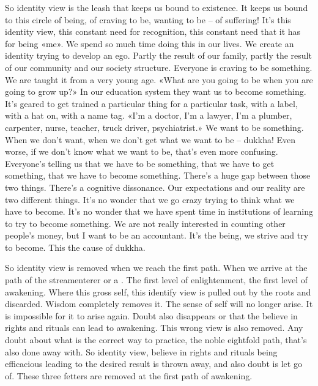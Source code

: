 \documentclass[letterpaper,10pt,english]{sphinxmanual}
\begin{document}
\sphinxAtStartPar
So identity view is the leash that keeps us bound to existence. It keeps
us bound to this circle of being, of craving to be, wanting to be – of suffering! It’s this identity view, this constant need for recognition, this constant
need that it has for being «me». We spend so much time doing this in our
  lives. We create an identity trying to develop an ego. Partly the result of our
family, partly the result of our community and our society structure. Everyone  is  craving  to  be  something.  We  are  taught  it  from  a  very  young  age.
«What are you going to be when you are going to grow up?» In our education system they want us to become something. It’s geared to get trained a
particular thing for a particular task, with a label, with a hat on, with a name
tag. «I’m a doctor, I’m a lawyer, I’m a plumber, carpenter, nurse, teacher,
truck driver, psychiatrist.» We want to be something. When we don’t want,
when we don’t get what we want to be – dukkha! Even worse, if we don’t
know what we want to be, that’s even more confusing. Everyone’s telling us
that we have to be something, that we have to get something, that we have
to become something.
There’s a huge gap between
those two things. There’s a cognitive dissonance. Our expectations and our
reality  are  two  different  things.  It’s  no  wonder  that  we  go  crazy  trying  to
think what we have to become. It’s no wonder that we have spent time in
institutions of learning to try to become something. We are not really interested in counting other people’s money, but I want to be an accountant. It’s
the being, we strive and try to become. This the cause of dukkha.

\sphinxAtStartPar
So  identity  view  is  removed  when  we  reach  the  first  path. When  we
arrive  at  the  path  of  the  stream\sphinxhyphen{}enterer  or  a
. The  first  level  of
enlightenment,  the  first  level  of  awakening.  Where  this  gross  self,  this
identify view is pulled out by the roots and discarded. Wisdom completely
removes it. The sense of self will no longer arise. It is impossible for it to
arise again. Doubt also disappears or that the believe in rights and rituals can
lead to awakening. This wrong view is also removed. Any doubt about what
is the correct way to practice, the noble eightfold path, that’s also done away
with. So identity view, believe in rights and rituals being efficacious leading
to the desired result is thrown away, and also doubt is let go of. These three
fetters are removed at the first path of awakening.
\end{document}
